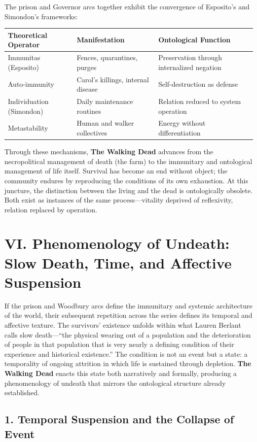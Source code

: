 \documentclass[11pt]{article}
\begin{document}
The prison and Governor arcs together exhibit the convergence of Esposito’s and Simondon’s frameworks:

\begin{center}
\begin{tabular}{lll}
Theoretical Operator & Manifestation & Ontological Function\\
\hline
Immunitas (Esposito) & Fences, quarantines, purges & Preservation through internalized negation\\
Auto-immunity & Carol’s killings, internal disease & Self-destruction as defense\\
Individuation (Simondon) & Daily maintenance routines & Relation reduced to system operation\\
Metastability & Human and walker collectives & Energy without differentiation\\
\end{tabular}
\end{center}

Through these mechanisms, \textbf{The Walking Dead} advances from the necropolitical management of death (the farm) to the immunitary and ontological management of life itself.  Survival has become an end without object; the community endures by reproducing the conditions of its own exhaustion.  At this juncture, the distinction between the living and the dead is ontologically obsolete.  Both exist as instances of the same process—vitality deprived of reflexivity, relation replaced by operation.  
\section*{VI. Phenomenology of Undeath: Slow Death, Time, and Affective Suspension}
\label{sec:orgab26d37}

If the prison and Woodbury arcs define the immunitary and systemic architecture of the world, their subsequent repetition across the series defines its temporal and affective texture.  The survivors’ existence unfolds within what Lauren Berlant calls slow death—“the physical wearing out of a population and the deterioration of people in that population that is very nearly a defining condition of their experience and historical existence.”  The condition is not an event but a state: a temporality of ongoing attrition in which life is sustained through depletion.  \textbf{The Walking Dead} enacts this state both narratively and formally, producing a phenomenology of undeath that mirrors the ontological structure already established.  
\subsection*{1. Temporal Suspension and the Collapse of Event}
\label{sec:org9baac92}
\end{document}
